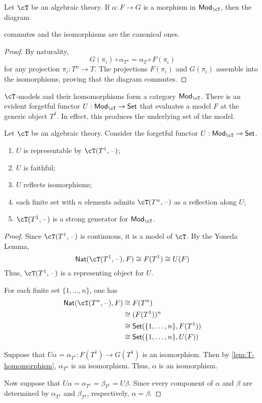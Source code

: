 \documentclass{amsart}
\begin{document}
\begin{lem}\label{lem:T-homomorphism}
  Let $\cT$ be an algebraic theory.
  If $\alpha : F \to G$ is a morphism in $\mathsf{Mod}_{\cT}$, then the diagram
  
  commutes and the isomorphisms are the canonical ones.
\end{lem}
\begin{proof}
  By naturality,
  \[
    G(\pi_{i}) \circ \alpha_{T^{n}} = \alpha_{T} \circ F(\pi_{i})
  \]
  for any projection $\pi_{i} : T^{n} \to T$.
  The projections $F(\pi_{i})$ and $G(\pi_{i})$ assemble into the isomorphisms, proving that the diagram commutes.
\end{proof}

$\cT$-models and their homomorphisms form a category $\mathsf{Mod}_{\cT}$.
There is an evident forgetful functor $U : \mathsf{Mod}_{\cT} \to \mathsf{Set}$ that evaluates a model $F$ at the generic object $T^{1}$.
In effect, this produces the underlying set of the model.

\begin{lem}
  Let $\cT$ be an algebraic theory.
  Consider the forgetful functor $U : \mathsf{Mod}_{\cT} \to \mathsf{Set}$.
  \begin{enumerate}
  \item $U$ is representable by $\cT(T^{1}, \blank)$;
  \item $U$ is faithful;
  \item $U$ reflects isomorphisms;
  \item each finite set with $n$ elements admits $\cT(T^{n}, \blank)$ as a reflection along $U$;
  \item $\cT(T^{1}, \blank)$ is a strong generator for $\mathsf{Mod}_{\cT}$.
  \end{enumerate}
\end{lem}
\begin{proof}
  Since $\cT(T^{1},\blank)$ is continuous, it is a model of $\cT$.
  By the Yoneda Lemma,
  \[
    \mathsf{Nat}(\cT(T^{1}, \blank), F) \iso F(T^{1}) \iso U(F)
  \]
  Thus, $\cT(T^{1},\blank)$ is a representing object for $U$.

  For each finite set $\{1,\ldots,n\}$, one has
  \begin{align}
    \mathsf{Nat}(\cT(T^{n},\blank), F) &\iso F(T^{n})\\
                                       &\iso (F(T^{1}))^{n}\\
                                       &\iso \mathsf{Set}(\{1,\ldots,n\}, F(T^{1}))\\
                                       &\iso \mathsf{Set}(\{1,\ldots,n\}, U(F))
  \end{align}

  Suppose that $U\alpha = \alpha_{T^{1}} : F(T^{1}) \to G(T^{1})$ is an isomorphism.
  Then by \cref{lem:T-homomorphism}, $\alpha_{T^{n}}$ is an isomorphism.
  Thus, $\alpha$ is an isomorphism.

  Now suppose that $U\alpha = \alpha_{T^{1}} = \beta_{T^{1}} = U\beta$.
  Since every component of $\alpha$ and $\beta$ are determined by $\alpha_{T^{1}}$ and $\beta_{T^{1}}$, respectively, $\alpha = \beta$.
\end{proof}
\end{document}
